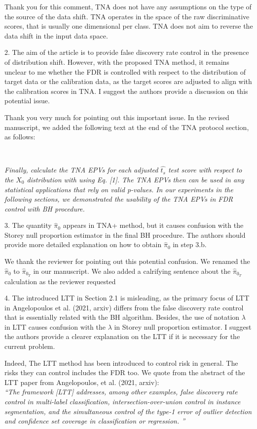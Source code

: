 \documentclass{article}
\newcommand{\response}[1]{\vspace*{1ex} \color{blue} \noindent #1 \color{black}
\vspace*{2ex}}
\begin{document}
\response{Thank you for this comment, TNA does not have any assumptions on the type of the source of the data shift. TNA operates in the space of the raw discriminative scores, that is usually one dimensional per class. TNA does not aim to reverse the data shift in the input data space.}


2. The aim of the article is to provide false discovery rate control in the presence of distribution shift.
However, with the proposed TNA method, it remains unclear to me whether the FDR is controlled with respect to the distribution of target data or the calibration data, as the target scores are adjusted to align with the calibration scores in TNA.
I suggest the authors provide a discussion on this potential issue.

\response{Thank you very much for pointing out this important issue. In the revised manuscript, we added the following text at the end of the TNA protocol section, as follows:

\

{\em Finally, calculate the TNA EPVs for each adjusted $\hat{t_s}$ test score with respect to the $X_0$ distribution with using Eq. [1]. The TNA EPVs then can be used in any statistical applications that rely on valid p-values. In our experiments in the following sections, we demonstrated the usability of the TNA EPVs in FDR control with BH procedure.}

}

3. The quantity $\hat{\pi}_0$ appears in TNA+ method, but it causes confusion with the Storey null proportion estimator in the final BH procedure.
The authors should provide more detailed explanation on how to obtain $\hat{\pi}_0$ in step 3.b.

\response{We thank the reviewer for pointing out this potential confusion. We renamed the  $\hat{\pi}_0$ to $\hat{\pi}_{0_{T}}$ in our manuscript. We also added a calrifying sentence about the $\hat{\pi}_{0_{T}}$ calculation as the reviewer requested}


4. The introduced LTT in Section 2.1 is misleading, as the primary focus of LTT in Angelopoulos et al. (2021, arxiv) differs from the false discovery rate control that is essentially related with the BH algorithm.
Besides, the use of notation $\lambda$ in LTT causes confusion with the $\lambda$ in Storey null proportion estimator.
I suggest the authors provide a clearer explanation on the LTT if it is necessary for the current problem.

\response{Indeed, The LTT method has been introduced to control risk in general. The risks they can control includes the FDR too. We quote from the abstract of the LTT paper from Angelopoulos, et al. (2021, arxiv):\\
{\em ``The framework [LTT] addresses, among other examples, false discovery rate control in multi-label classification, intersection-over-union control in instance segmentation, and the simultaneous control of the type-1 error of outlier detection and confidence set coverage in classification or regression. ''}}
\end{document}
